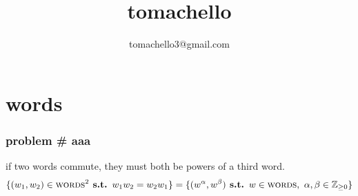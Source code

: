 \documentclass{article}
\title{tomachello}
\author{tomachello3@gmail.com}
\date{}
\newcommand{\st}{\textbf{ s.t. }}
\newcommand{\SP}{\text{ }}
\newcommand{\problem}[1]{\subsubsection*{problem \# #1}}
\newcommand{\chapter}[1]{\section*{#1}}
\newcommand{\Zpf}{\mathbb{Z}_{\ge0}}
\newcommand{\words}{\textsc{words}}
\begin{document}
\maketitle

\chapter{words}
\problem{aaa} if two words commute, they must both be powers of a third word. 
$$\{(w_1,w_2)\in \words^2 \st w_1w_2=w_2w_1\}=\{(w^\alpha,w^\beta)\st w\in\words,\SP\alpha,\beta\in\Zpf\}$$
\end{document}
